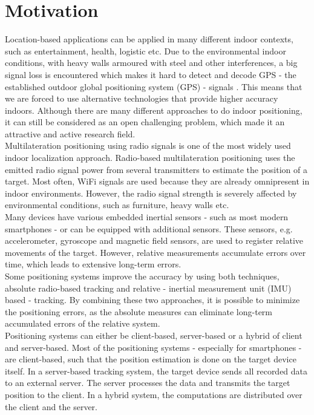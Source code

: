 \section{Motivation}
Location-based applications can be applied in many different indoor contexts, such as entertainment, health, logistic etc. Due to the environmental indoor conditions, with heavy walls armoured with steel and other interferences, a big signal loss is encountered which makes it hard to detect and decode GPS - the established outdoor global positioning system (GPS) - signals \cite{GPSforIndoor}. This means that we are forced to use alternative technologies that provide higher accuracy indoors. Although there are many different approaches to do indoor positioning, it can still be considered as an open challenging problem, which made it an attractive and active research field.\\
\noindent\hspace*{5mm}%
Multilateration positioning using radio signals is one of the most widely used indoor localization approach. Radio-based multilateration positioning uses the emitted radio signal power from several transmitters to estimate the position of a target. Most often, WiFi signals are used because they are already omnipresent in indoor environments. However, the radio signal strength is severely affected by environmental conditions, such as furniture, heavy walls etc.\\
\noindent\hspace*{5mm}%
Many devices have various embedded inertial sensors - such as most modern smartphones - or can be equipped with additional sensors. These sensors, e.g. accelerometer, gyroscope and magnetic field sensors, are used to register relative movements of the target. However, relative measurements accumulate errors over time, which leads to extensive long-term errors.\\
\noindent\hspace*{5mm}%
Some positioning systems improve the accuracy by using both techniques, absolute radio-based tracking and relative - inertial measurement unit (IMU) based - tracking. By combining these two approaches, it is possible to minimize the positioning errors, as the absolute measures can eliminate long-term accumulated errors of the relative system. \\
\noindent\hspace*{5mm}%
Positioning systems can either be client-based, server-based or a hybrid of client and server-based. Most of the positioning systems - especially for smartphones - are client-based, such that the position estimation is done on the target device itself. In a server-based tracking system, the target device sends all recorded data to an external server. The server processes the data and transmits the target position to the client. In a hybrid system, the computations are distributed over the client and the server. \\
